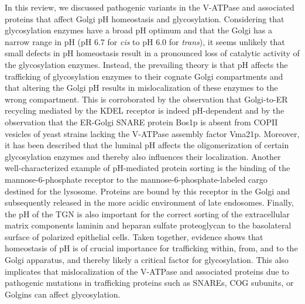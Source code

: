 In this review, we discussed pathogenic variants in the V-ATPase and associated proteins that affect Golgi pH homeostasis and glycosylation. Considering that glycosylation enzymes have a broad pH optimum and that the Golgi has a narrow range in pH (pH 6.7 for \emph{cis} to pH 6.0 for \emph{trans}), it seems unlikely that small defects in pH homeostasis result in a pronounced loss of catalytic activity of the glycosylation enzymes. Instead, the prevailing theory is that pH affects the trafficking of glycosylation enzymes to their cognate Golgi compartments and that altering the Golgi pH results in mislocalization of these enzymes to the wrong compartment\cite{fisher_bridging_2016,rivinoja_elevated_2009,maeda_chapter_2010}. This is corroborated by the observation that Golgi-to-ER recycling mediated by the KDEL receptor is indeed pH-dependent\cite{brauer_structural_2019} and by the observation that the ER-Golgi SNARE protein Bos1p is absent from COPII vesicles of yeast strains lacking the V-ATPase assembly factor Vma21p\cite{welsh_genetic_2006}. Moreover, it has been described that the luminal pH affects the oligomerization of certain glycosylation enzymes and thereby also influences their localization\cite{bhide_sialylation_2017,nilsson_kin_1994,nilsson_role_1996,nilsson_kin_1993,chen_formation_2000,fenteany_multiple_2005,opat_medial_2000,hassinen_organizational_2014}. Another well-characterized example of pH-mediated protein sorting is the binding of the mannose-6-phosphate receptor to the mannose-6-phosphate-labeled cargo destined for the lysosome. Proteins are bound by this receptor in the Golgi and subsequently released in the more acidic environment of late endosomes\cite{kellokumpu_golgi_2019,kokkonen_defective_2004,ghosh_mannose_2003}. Finally, the pH of the TGN is also important for the correct sorting of the extracellular matrix components laminin and heparan sulfate proteoglycan to the basolateral surface of polarized epithelial cells\cite{kellokumpu_golgi_2019,caplan_dependence_1987,guo_protein_2014}. Taken together, evidence shows that homeostasis of pH is of crucial importance for trafficking within, from, and to the Golgi apparatus, and thereby likely a critical factor for glycosylation. This also implicates that mislocalization of the V-ATPase and associated proteins due to pathogenic mutations in trafficking proteins such as SNAREs, COG subunits, or Golgins can affect glycosylation.

